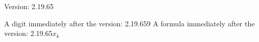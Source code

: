 \documentclass[a4paper, 12pt]{article}
\begin{document}
Version: 2.19.65

A digit immediately after the version: 2.19.659
A formula immediately after the version: 2.19.65$x_k$
\end{document}

